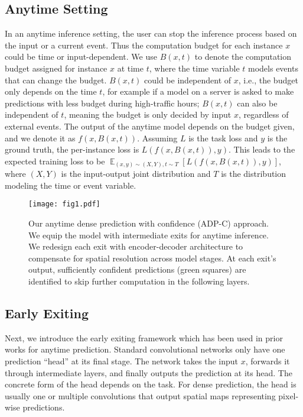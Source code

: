 \subsection{Anytime Setting}
\label{sec:anytime}
In an anytime inference setting, the user can stop the inference process based on the input or a current event.
Thus the computation budget for each instance $x$ could be time or input-dependent.
We use $B(x, t)$ to denote the computation budget assigned for instance $x$ at time $t$, where the time variable $t$ models events that can change the budget.
$B(x, t)$ could be independent of $x$, i.e., the budget only depends on the time $t$, for example if a model on a server is asked to make predictions with less budget during high-traffic hours; $B(x, t)$ can also be independent of $t$, meaning the budget is only decided by input $x$, regardless of external events.
The output of the anytime model depends on the budget given, and we denote it as $f(x, B(x, t))$.
Assuming $L$ is the task loss and $y$ is the ground truth, the per-instance loss is $L(f\left(x, B\left(x, t\right)\right), y)$.
This leads to the expected training loss to be $\mathop{\mathbb{E}}_{(x,y)\sim (X, Y), t\sim T}[L(f\left(x, B\left(x, t\right)\right), y)]$, where $(X, Y)$ is the input-output joint distribution and $T$ is the distribution modeling the time or event variable.

\begin{figure}[t]
\texttt{[image: fig1.pdf]}
\caption{%
Our anytime dense prediction with confidence (ADP-C) approach. 
We equip the model with intermediate exits for anytime inference.
We redesign each exit with encoder-decoder architecture to compensate for spatial resolution across model stages.
At each exit's output, sufficiently confident predictions (green squares) are identified to skip further computation in the following layers.
}
\label{fig:fig1}
\end{figure}
\subsection{Early Exiting}
Next, we introduce the early exiting framework which has been used in prior works \cite{huang2017multi,teerapittayanon2016branchynet} for anytime prediction. Standard convolutional networks only have one prediction ``head'' at its final stage.
The network takes the input $x$, forwards it through intermediate layers, and finally outputs the prediction at its head.
The concrete form of the head depends on the task. 
For dense prediction, the head is usually one or multiple convolutions that output spatial maps representing pixel-wise predictions. 

